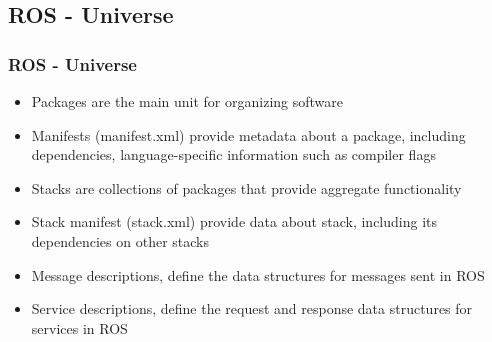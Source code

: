 \subsection{ROS - Universe}





\begin{frame}
  \frametitle{ROS - Universe}

\begin{itemize}
 \item Packages are the main unit for organizing software
 \item Manifests (manifest.xml) provide metadata about a package, including dependencies, language-specific information such as compiler flags
 \item Stacks are collections of packages that provide aggregate functionality
 \item Stack manifest (stack.xml) provide data about stack, including its dependencies on other stacks
 \item Message descriptions, define the data structures for messages sent in ROS
 \item Service descriptions, define the request and response data structures for services in ROS
\end{itemize} 
\end{frame}

